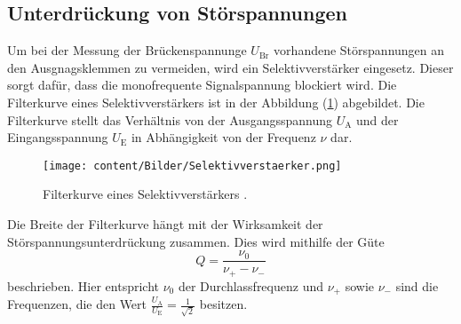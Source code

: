 \subsection{Unterdrückung von Störspannungen}
Um bei der Messung der Brückenspannunge $U_{\text{Br}}$ vorhandene Störspannungen an den Ausgnagsklemmen zu vermeiden, 
wird ein Selektivverstärker eingesetz. Dieser sorgt dafür, dass die monofrequente Signalspannung blockiert wird. Die Filterkurve 
eines Selektivverstärkers ist in der Abbildung (\ref{fig:Selektivverstaerker}) abgebildet. Die Filterkurve stellt das Verhältnis von 
der Ausgangsspannung $U_{\text{A}}$ und der Eingangsspannung $U_{\text{E}}$ in Abhängigkeit von der Frequenz $\nu$ dar.
\begin{figure}[H]
    \centering
    \texttt{[image: content/Bilder/Selektivverstaerker.png]}
    \caption{Filterkurve eines Selektivverstärkers \cite{anleitungV606}.}
    \label{fig:Selektivverstaerker}
\end{figure} 
Die Breite der Filterkurve hängt mit der Wirksamkeit der Störspannungsunterdrückung zusammen.
Dies wird mithilfe der Güte 
\begin{equation}
    Q = \frac{\nu _0}{\nu _{+}- \nu _{-}}
    \label{eqn:Guete}
\end{equation}
beschrieben. Hier entspricht $\nu_0$ der Durchlassfrequenz und $\nu _{+}$ sowie $\nu _{-}$ sind die Frequenzen, die den Wert $\frac{U_{\text{A}}}{U_{\text{E}}} = \frac{1}{\sqrt{2}}$ besitzen. 
